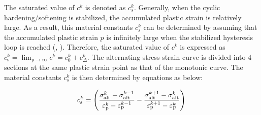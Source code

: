 \documentclass[preprint,5p,twocolumn,10pt,sort&compress]{elsarticle}
\begin{document}
The saturated value of $c^{k}$ is denoted as $c_{s}^{k}$. Generally, when the cyclic hardening/softening is stabilized, the accumulated plastic strain is relatively large. As a result, this material constants $c_{s}^{k}$ can be determined by assuming that the accumulated plastic strain $p$ is infinitely large when the stabilized hysteresis loop is reached (\citeauthor{SunCyclic}, \citeyear{SunCyclic}). Therefore, the saturated value of $c^{k}$ is expressed as $c_{\mathrm{s}}^{k}=\lim _{\mathrm{p} \rightarrow \infty} c^{k}=c_{0}^{k}+c_{\Delta}^{k}$. The alternating stress-strain curve is divided into 4 sections at the same plastic strain point as that of the monotonic curve. The material constants $c_{s}^{k}$ is then determined by equations as below:

\begin{equation}
c_{\mathrm{s}}^{k}=\left(\frac{\sigma_{\mathrm{alt}}^{k}-\sigma_{\mathrm{alt}}^{k-1}}{\varepsilon_{\mathrm{p}}^{k}-\varepsilon_{\mathrm{p}}^{k-1}} -\frac{\sigma_{\mathrm{alt}}^{k+1}-\sigma_{\mathrm{alt}}^{k}}{\varepsilon_{\mathrm{p}}^{k+1}-\varepsilon_{\mathrm{P}}^{k}}\right) \\
\end{equation}
\end{document}
